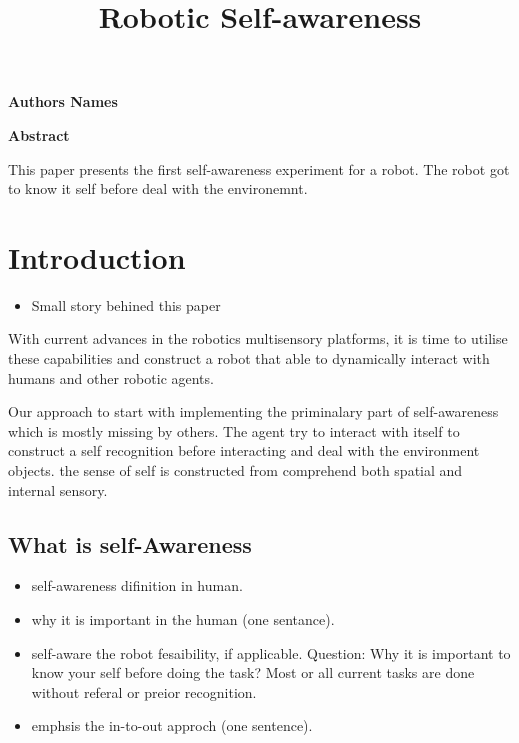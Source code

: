 \documentclass[12pt]{article}
\begin{document}
\title{Robotic Self-awareness}
\maketitle

\begin{center}
    \vspace{0.4cm}
    \textbf{Authors Names}
    
    \vspace{0.9cm}
    \textbf{Abstract}
\end{center}
This paper presents the first self-awareness experiment for a robot. The robot got to know it self before deal with the environemnt. 
\pagebreak

\section{Introduction}
\begin{itemize}
\item Small story behined this paper
\end{itemize}
With current advances in the robotics multisensory platforms, it is time to utilise these capabilities and construct a robot that able to dynamically interact with humans and other robotic agents.

Our approach to start with implementing the priminalary part of self-awareness which is mostly missing by others. The agent try to interact with itself to construct a self recognition before interacting and deal with the environment objects. the sense of self is constructed from comprehend both spatial and internal sensory. 
 
\subsection{What is self-Awareness}
\begin{itemize}
\item self-awareness difinition in human.
\item why it is important in the human (one sentance).
\item self-aware the robot fesaibility, if applicable.
\newline
Question: Why it is important to know your self before doing the task? Most or all  current tasks are done without referal or preior recognition.
\item emphsis the in-to-out approch (one sentence).
\end{itemize}
\end{document}
